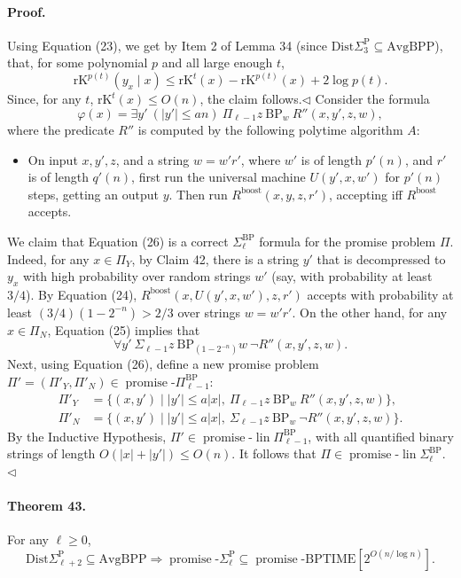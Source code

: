 \paragraph{Proof.} Using Equation (23), we get by Item 2 of Lemma 34 (since $\mathrm{Dist}\Sigma_3^{\mathrm P}\subseteq\mathrm{AvgBPP}$), that, for some polynomial $p$ and all large enough $t$,
\[\mathrm{rK}^{p(t)}(y_x\mid x)\leq\mathrm{rK}^t(x)-\mathrm{rK}^{p(t)}(x)+2\log p(t).\]
Since, for any $t$, $\mathrm{rK}^t(x)\leq O(n)$, the claim follows.\hfill$\triangleleft$
Consider the formula
\[\varphi(x)=\exists y'\ (|y'|\leq an)\ \Pi_{\ell-1}z\ \mathrm{BP}_w\ R''(x,y',z,w),\tag{26}\]
where the predicate $R''$ is computed by the following polytime algorithm $A$:
\begin{itemize}
\item On input $x,y',z$, and a string $w=w'r'$, where $w'$ is of length $p'(n)$, and $r'$ is of length $q'(n)$, first run the universal machine $U(y',x,w')$ for $p'(n)$ steps, getting an output $y$. Then run $R^{\mathrm{boost}}(x,y,z,r')$, accepting iff $R^{\mathrm{boost}}$ accepts.
\end{itemize}
We claim that Equation (26) is a correct $\Sigma_\ell^{\mathrm{BP}}$ formula for the promise problem $\Pi$. Indeed, for any $x\in\Pi_Y$, by Claim 42, there is a string $y'$ that is decompressed to $y_x$ with high probability over random strings $w'$ (say, with probability at least $3/4$). By Equation (24), $R^{\mathrm{boost}}(x,U(y',x,w'),z,r')$ accepts with probability at least $(3/4)(1-2^{-n})>2/3$ over strings $w=w'r'$. On the other hand, for any $x\in\Pi_N$, Equation (25) implies that
\[\forall y'\ \Sigma_{\ell-1}z\ \mathrm{BP}_{(1-2^{-n})}w\ \neg R''(x,y',z,w).\]
Next, using Equation (26), define a new promise problem $\Pi'=(\Pi'_Y,\Pi'_N)\in\operatorname{promise}\text{-}\Pi_{\ell-1}^{\mathrm{BP}}$:
\begin{align*}
\Pi'_Y&=\{(x,y')\mid|y'|\leq a|x|,\ \Pi_{\ell-1}z\ \mathrm{BP}_w\ R''(x,y',z,w)\},\\
\Pi'_N&=\{(x,y')\mid|y'|\leq a|x|,\ \Sigma_{\ell-1}z\ \mathrm{BP}_w\ \neg R''(x,y',z,w)\}.
\end{align*}
By the Inductive Hypothesis, $\Pi'\in\operatorname{promise}\text{-}\operatorname{lin}\Pi_{\ell-1}^{\mathrm{BP}}$, with all quantified binary strings of length $O(|x|+|y'|)\leq O(n)$. It follows that $\Pi\in\operatorname{promise}\text{-}\operatorname{lin}\Sigma_\ell^{\mathrm{BP}}$.\hfill$\triangleleft$
\paragraph{Theorem 43.} For any $\ell\geq0$,
\[\mathrm{Dist}\Sigma_{\ell+2}^{\mathrm P}\subseteq\mathrm{AvgBPP}\Longrightarrow\operatorname{promise}\text{-}\Sigma_\ell^{\mathrm P}\subseteq\operatorname{promise}\text{-}\mathrm{BPTIME}[2^{O(n/\log n)}].\]
